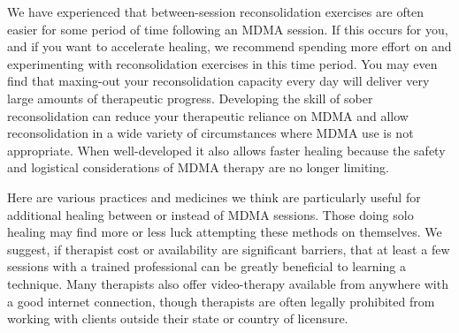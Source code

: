 \documentclass[12pt,letterpaper]{book}
\begin{document}
We have experienced that between-session reconsolidation exercises are often easier for some period of time following an MDMA session. If this occurs for you, and if you want to accelerate healing, we recommend spending more effort on and experimenting with reconsolidation exercises in this time period. You may even find that maxing-out your reconsolidation capacity every day will deliver very large amounts of therapeutic progress. Developing the skill of sober reconsolidation can reduce your therapeutic reliance on MDMA and allow reconsolidation in a wide variety of circumstances where MDMA use is not appropriate. When well-developed it also allows faster healing because the safety and logistical considerations of MDMA therapy are no longer limiting.

Here are various practices and medicines we think are particularly useful for additional healing between or instead of MDMA sessions. Those doing solo healing may find more or less luck attempting these methods on themselves. We suggest, if therapist cost or availability are significant barriers, that at least a few sessions with a trained professional can be greatly beneficial to learning a technique. Many therapists also offer video-therapy available from anywhere with a good internet connection, though therapists are often legally prohibited from working with clients outside their state or country of licensure.
\end{document}

